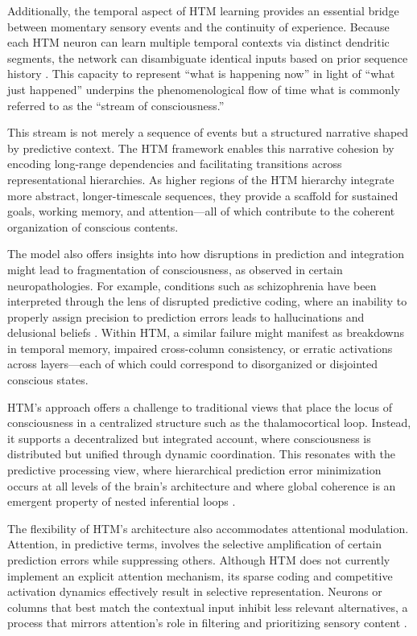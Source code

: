 \documentclass{article}
\begin{document}
Additionally, the temporal aspect of HTM learning provides an essential bridge between momentary sensory events and the continuity of experience. Because each HTM neuron can learn multiple temporal contexts via distinct dendritic segments, the network can disambiguate identical inputs based on prior sequence history \parencite{hawkins2016why}. This capacity to represent “what is happening now” in light of “what just happened” underpins the phenomenological flow of time what is commonly referred to as the “stream of consciousness.”

This stream is not merely a sequence of events but a structured narrative shaped by predictive context. The HTM framework enables this narrative cohesion by encoding long-range dependencies and facilitating transitions across representational hierarchies. As higher regions of the HTM hierarchy integrate more abstract, longer-timescale sequences, they provide a scaffold for sustained goals, working memory, and attention—all of which contribute to the coherent organization of conscious contents.

The model also offers insights into how disruptions in prediction and integration might lead to fragmentation of consciousness, as observed in certain neuropathologies. For example, conditions such as schizophrenia have been interpreted through the lens of disrupted predictive coding, where an inability to properly assign precision to prediction errors leads to hallucinations and delusional beliefs \parencite{clark2016surfing}. Within HTM, a similar failure might manifest as breakdowns in temporal memory, impaired cross-column consistency, or erratic activations across layers—each of which could correspond to disorganized or disjointed conscious states.

HTM’s approach offers a challenge to traditional views that place the locus of consciousness in a centralized structure such as the thalamocortical loop. Instead, it supports a decentralized but integrated account, where consciousness is distributed but unified through dynamic coordination. This resonates with the predictive processing view, where hierarchical prediction error minimization occurs at all levels of the brain's architecture and where global coherence is an emergent property of nested inferential loops \parencite{friston2010free}.

The flexibility of HTM’s architecture also accommodates attentional modulation. Attention, in predictive terms, involves the selective amplification of certain prediction errors while suppressing others. Although HTM does not currently implement an explicit attention mechanism, its sparse coding and competitive activation dynamics effectively result in selective representation. Neurons or columns that best match the contextual input inhibit less relevant alternatives, a process that mirrors attention's role in filtering and prioritizing sensory content \parencite{cui2017spatial}.
\end{document}
